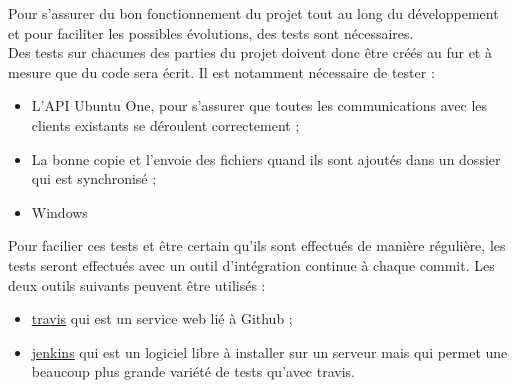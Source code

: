 Pour s'assurer du bon fonctionnement du projet tout au long du développement et pour faciliter les possibles évolutions, des tests sont nécessaires.\\

Des tests sur chacunes des parties du projet doivent donc être créés au fur et à mesure que du code sera écrit. Il est notamment nécessaire de tester :\\

\begin{itemize}
\renewcommand{\labelitemi}{$\bullet$}
\item L'API Ubuntu One, pour s'assurer que toutes les communications avec les clients existants se déroulent correctement ;
\item La bonne copie et l'envoie des fichiers quand ils sont ajoutés dans un dossier qui est synchronisé ;
\item Windows
\end{itemize}

\vspace{0.5cm}

Pour facilier ces tests et être certain qu'ils sont effectués de manière régulière, les tests seront effectués avec un outil d'intégration continue à chaque commit. Les deux outils suivants peuvent être utilisés :\\

\begin{itemize}
\renewcommand{\labelitemi}{$\bullet$}
\item \href{https://travis-ci.org}{travis} qui est un service web lié à Github ;
\item \href{http://jenkins-ci.org}{jenkins} qui est un logiciel libre à installer sur un serveur mais qui permet une beaucoup plus grande variété de tests qu'avec travis.
\end{itemize}
